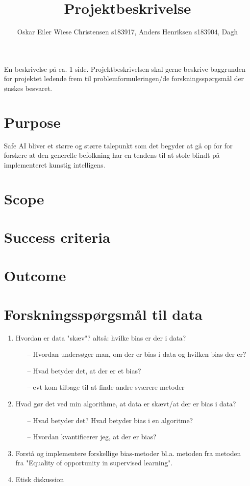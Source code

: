\documentclass[11pt, fleqn]{article}
\title{Projektbeskrivelse}
\author{Oskar Eiler Wiese Christensen s183917, Anders Henriksen s183904, Dagh}
\begin{document}
	\maketitle
	En beskrivelse på ca. 1 side. Projektbeskrivelsen skal gerne beskrive
	baggrunden for projektet ledende frem til problemformuleringen/de
	forskningsspørgsmål der ønskes besvaret. 
	
	\section*{Purpose}
	Safe AI bliver et større og større talepunkt som det begyder at gå op for for forskere at den generelle befolkning har en tendens til at stole blindt på implementeret kunstig intelligens. 
	
	\section*{Scope}
	
	
	\section*{Success criteria}
	
	
	\section*{Outcome}
	
	
	
	\section*{Forskningsspørgsmål til data}
	\begin{enumerate}
		\item Hvordan er data "skæv"? altså: hvilke bias er der i data? 
		\begin{itemize}
			\item[--] Hvordan undersøger man, om der er bias i data og hvilken bias der er?
			\item[--] Hvad betyder det, at der er et bias?
			\item[--] evt kom tilbage til at finde andre sværere metoder
		\end{itemize}
		
		\item Hvad gør det ved min algorithme, at data er skævt/at der er bias i data?
		\begin{itemize}
			\item[--] Hvad betyder det? Hvad betyder bias i en algoritme?
			\item[--] Hvordan kvantificerer jeg, at der er bias?
		\end{itemize}
		
		\item Forstå og implementere forskellige bias-metoder bl.a. metoden fra metoden fra "Equality of opportunity in supervised learning".
		
		\item Etisk diskussion
		
	\end{enumerate}
	
\end{document}
